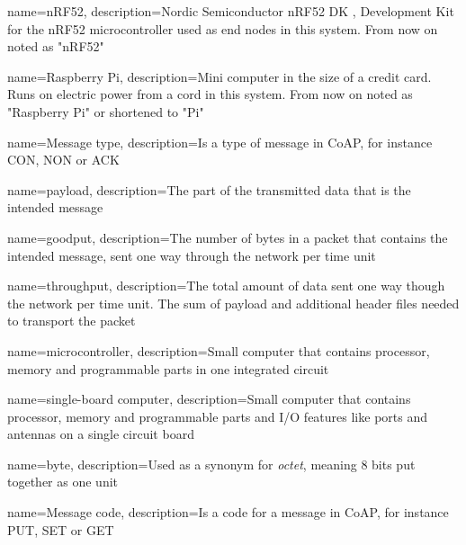 \pagestyle{empty}


{
	name=nRF52,
    description={Nordic Semiconductor nRF52 DK , Development Kit for the nRF52 microcontroller used as end nodes in this system. From now on noted as "nRF52"}
}

{
	name=Raspberry Pi,
    description={Mini computer in the size of a credit card. Runs on electric power from a cord in this system. From now on noted as "Raspberry Pi" or shortened to "Pi"}
}


{
    name=Message type,
    description={Is a type of message in CoAP, for instance CON, NON or ACK}
}

{
    name=payload,
    description={The part of the transmitted data that is the intended message}
}

{
	name=goodput,
	description={The number of bytes in a packet that contains the intended message, sent one way through the network per time unit}
}

{
	name=throughput,
	description={The total amount of data sent one way though the network per time unit. The sum of payload and additional header files needed to transport the packet}
}

{
    name=microcontroller,
    description={Small computer that contains processor, memory and programmable parts in one integrated circuit}
}

{
    name=single-board computer,
    description={Small computer that contains processor, memory and programmable parts and I/O features like ports and antennas on a single circuit board}
}

{
    name=byte,
    description={Used as a synonym for \textit{octet}, meaning 8 bits put together as one unit}
}

{
    name=Message code,
    description={Is a code for a message in CoAP, for instance PUT, SET or GET}
}





